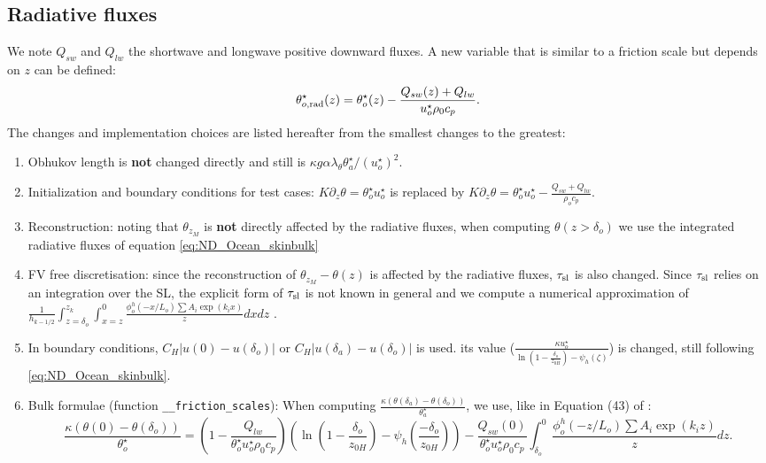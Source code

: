 \subsection{Radiative fluxes}
We note $Q_{sw}$ and $Q_{lw}$ the shortwave and longwave positive
downward fluxes. A new variable that is similar to a friction
scale but depends on $z$ can be defined:
\begin{equation}
\theta^\star_{o, \rm rad}(z) =
	\theta^\star_{o}(z) -
	\frac{Q_{sw}(z) + Q_{lw}}{u^{\star}_o\rho_0 c_p}.
\end{equation}
The changes and implementation choices are listed hereafter from
the smallest changes to the greatest:
\begin{enumerate}
	\item Obhukov length is \textbf{not} changed directly and
		still is $\kappa g \alpha \lambda_\theta
		\theta^\star_a / (u^\star_o)^2$.
	\item Initialization and boundary conditions for test cases:
		$K\partial_z \theta = \theta^{\star}_o u^{\star}_o$
		is replaced by
		$K\partial_z \theta = \theta^{\star}_o u^{\star}_o
		- \frac{Q_{sw} + Q_{lw}}{\rho_o c_p}$.
	\item Reconstruction: noting that $\theta_{z_M}$ is
		\textbf{not} directly affected by the
		radiative fluxes, when computing $\theta(z>\delta_o)$
		we use the integrated radiative fluxes of
		equation \eqref{eq:ND_Ocean_skinbulk}
	\item FV free discretisation: since the reconstruction
		of $\theta_{z_M} - \theta(z)$ is affected by
		the radiative fluxes, $\tau_{\rm sl}$ is also
		changed. Since $\tau_{\rm sl}$ relies on an
		integration over the SL, the explicit form
		of $\tau_{\rm sl}$ is not known in general
		and we compute a numerical approximation of
		$\frac{1}{h_{k-1/2}}\int_{z=\delta_o}^{z_k}
		\int_{x=z}^0 \frac{\phi^h_o(-x/L_o)
		\sum A_i \exp (k_i x)
		}{z}dx dz$
		.
	\item In boundary conditions, $C_H |u(0)-u(\delta_o)|$ or
		$C_H |u(\delta_a)-u(\delta_o)|$ is used.
		its value ($\frac{\kappa u^{\star}_o}
		{\ln(1-\frac{\delta_o}{z_{0H}}) - \psi_h(\zeta)}$)
		is changed, still following
		\eqref{eq:ND_Ocean_skinbulk}.
	\item Bulk formulae (function \verb|__friction_scales|):
		When computing
		$\frac{\kappa (\theta(\delta_a) - \theta(\delta_o))}
		{\theta_a^{\star}}$,
		we use, like in
		Equation (43) of \citep{pelletier2021two}:
	\begin{equation}
		\label{eq:ND_Ocean_skinbulk}
		\frac{\kappa (\theta(0) - \theta(\delta_o))}
		{\theta_o^{\star}} = (1 -
		\frac{Q_{lw}}{\theta_o^{\star}u_o^{\star}\rho_0 c_p})
		\left(\ln (1 - \frac{\delta_o}{z_{0H}}) -
		\psi_h(\frac{-\delta_o}{z_{0H}})\right)
		- \frac{Q_{sw}(0)}{\theta_o^{\star}u_o^{\star}\rho_0 c_p}
		\int_{\delta_o}^0 \frac{\phi^h_o(-z/L_o)
		\sum A_i \exp (k_i z)
		}{z}dz.
	\end{equation}
\end{enumerate}
